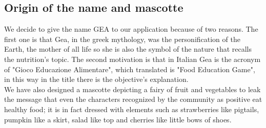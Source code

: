 \subsection{Origin of the name and mascotte}
We decide to give the name GEA to our application because of two reasons. The first one is that Gea, in the greek mythology, was the personification of the Earth, the mother of all life so she is also the symbol of the nature that recalls the nutrition's topic. The second motivation is that in Italian Gea is the acronym of "Gioco Educazione Alimentare", which translated is "Food Education Game", in this way in the title there is the objective's explanation.\\
We have also designed a mascotte depicting a fairy of fruit and vegetables to leak the message that even the characters recognized by the community as positive eat healthy food; it is in fact dressed with elements such as strawberries like pigtails, pumpkin like a skirt, salad like top and cherries like little bows of shoes.
